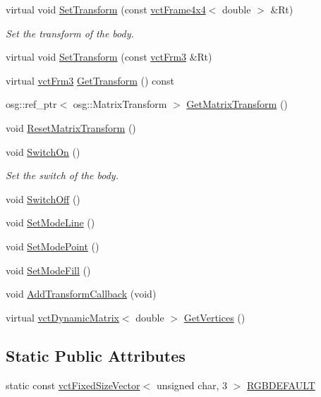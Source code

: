 \begin{DoxyCompactItemize}
\item 
virtual void \hyperlink{classosa_o_s_g_body_a36cf781f0130e65f4f15d5eccf4ec2d6}{Set\+Transform} (const \hyperlink{classvct_frame4x4}{vct\+Frame4x4}$<$ double $>$ \&Rt)
\begin{DoxyCompactList}\small\item\em Set the transform of the body. \end{DoxyCompactList}\item 
virtual void \hyperlink{classosa_o_s_g_body_a61410eae63510e4ba7fe78f661c4610c}{Set\+Transform} (const \hyperlink{vct_transformation_types_8h_a81feda0a02c2d1bc26e5553f409fed20}{vct\+Frm3} \&Rt)
\item 
virtual \hyperlink{vct_transformation_types_8h_a81feda0a02c2d1bc26e5553f409fed20}{vct\+Frm3} \hyperlink{classosa_o_s_g_body_ac22959f804a2dc15719ec629ad07279d}{Get\+Transform} () const 
\item 
osg\+::ref\+\_\+ptr$<$ osg\+::\+Matrix\+Transform $>$ \hyperlink{classosa_o_s_g_body_abcc307546662a42733de2dea2e10e851}{Get\+Matrix\+Transform} ()
\item 
void \hyperlink{classosa_o_s_g_body_ab479ffc60d72ed0020df994697d32d30}{Reset\+Matrix\+Transform} ()
\item 
void \hyperlink{classosa_o_s_g_body_a9a343ad069313433173693e26c14dce8}{Switch\+On} ()
\begin{DoxyCompactList}\small\item\em Set the switch of the body. \end{DoxyCompactList}\item 
void \hyperlink{classosa_o_s_g_body_a11af6fd2348d929acc980912752600b8}{Switch\+Off} ()
\item 
void \hyperlink{classosa_o_s_g_body_ac39ca380d1e93ed69d5fc8f0712372fc}{Set\+Mode\+Line} ()
\item 
void \hyperlink{classosa_o_s_g_body_a4d09a9ed74fa9e9a4df4c391ff209922}{Set\+Mode\+Point} ()
\item 
void \hyperlink{classosa_o_s_g_body_a45017ba1447b30b209a442535f8478ff}{Set\+Mode\+Fill} ()
\item 
void \hyperlink{classosa_o_s_g_body_ab449b4711f73c026e12d5909a1862d23}{Add\+Transform\+Callback} (void)
\item 
virtual \hyperlink{classvct_dynamic_matrix}{vct\+Dynamic\+Matrix}$<$ double $>$ \hyperlink{classosa_o_s_g_body_ad881ba711ad450edb98bb909fe1a7052}{Get\+Vertices} ()
\end{DoxyCompactItemize}
\subsection*{Static Public Attributes}
\begin{DoxyCompactItemize}
\item 
static const \hyperlink{classvct_fixed_size_vector}{vct\+Fixed\+Size\+Vector}$<$ unsigned char, 3 $>$ \hyperlink{classosa_o_s_g_body_a1fb439b90b8d0277e28240e35de006dd}{R\+G\+B\+D\+E\+F\+A\+U\+L\+T}
\end{DoxyCompactItemize}
